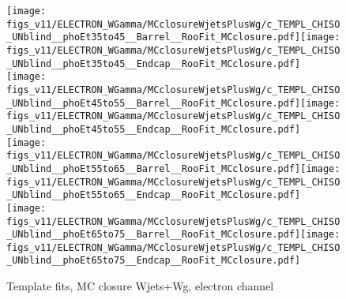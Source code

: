 \begin{figure}[htb]
  \begin{center}
   \texttt{[image: figs\_v11/ELECTRON\_WGamma/MCclosureWjetsPlusWg/c\_TEMPL\_CHISO\_UNblind\_\_phoEt35to45\_\_Barrel\_\_RooFit\_MCclosure.pdf]}\texttt{[image: figs\_v11/ELECTRON\_WGamma/MCclosureWjetsPlusWg/c\_TEMPL\_CHISO\_UNblind\_\_phoEt35to45\_\_Endcap\_\_RooFit\_MCclosure.pdf]}\\
   \texttt{[image: figs\_v11/ELECTRON\_WGamma/MCclosureWjetsPlusWg/c\_TEMPL\_CHISO\_UNblind\_\_phoEt45to55\_\_Barrel\_\_RooFit\_MCclosure.pdf]}\texttt{[image: figs\_v11/ELECTRON\_WGamma/MCclosureWjetsPlusWg/c\_TEMPL\_CHISO\_UNblind\_\_phoEt45to55\_\_Endcap\_\_RooFit\_MCclosure.pdf]}\\
   \texttt{[image: figs\_v11/ELECTRON\_WGamma/MCclosureWjetsPlusWg/c\_TEMPL\_CHISO\_UNblind\_\_phoEt55to65\_\_Barrel\_\_RooFit\_MCclosure.pdf]}\texttt{[image: figs\_v11/ELECTRON\_WGamma/MCclosureWjetsPlusWg/c\_TEMPL\_CHISO\_UNblind\_\_phoEt55to65\_\_Endcap\_\_RooFit\_MCclosure.pdf]}\\
   \texttt{[image: figs\_v11/ELECTRON\_WGamma/MCclosureWjetsPlusWg/c\_TEMPL\_CHISO\_UNblind\_\_phoEt65to75\_\_Barrel\_\_RooFit\_MCclosure.pdf]}\texttt{[image: figs\_v11/ELECTRON\_WGamma/MCclosureWjetsPlusWg/c\_TEMPL\_CHISO\_UNblind\_\_phoEt65to75\_\_Endcap\_\_RooFit\_MCclosure.pdf]}\\
  \label{fig:templateFits_MCclosureWjetsPlusWg_CHISO_ELECTRON_2}
  \caption{Template fits, MC closure Wjets+Wg, electron channel}
  \end{center}
\end{figure}

